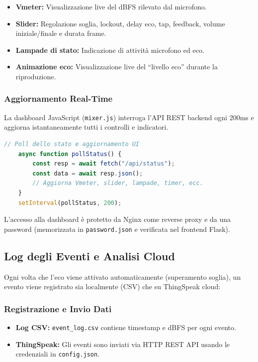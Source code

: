 \documentclass[fleqn,10pt]{SelfArx} %
\begin{document}
\begin{itemize}
	\item \textbf{Vmeter:} Visualizzazione live del dBFS rilevato dal microfono.
	\item \textbf{Slider:} Regolazione soglia, lockout, delay eco, tap, feedback, volume iniziale/finale e durata frame.
	\item \textbf{Lampade di stato:} Indicazione di attività microfono ed eco.
	\item \textbf{Animazione eco:} Visualizzazione live del “livello eco” durante la riproduzione.
\end{itemize}

\subsubsection{Aggiornamento Real-Time}

La dashboard JavaScript (\texttt{mixer.js}) interroga l’API REST backend ogni 200ms e aggiorna istantaneamente tutti i controlli e indicatori.

\begin{lstlisting}[language=JavaScript]
	// Poll dello stato e aggiornamento UI
	async function pollStatus() {
		const resp = await fetch("/api/status");
		const data = await resp.json();
		// Aggiorna Vmeter, slider, lampade, timer, ecc.
	}
	setInterval(pollStatus, 200);
\end{lstlisting}

L’accesso alla dashboard è protetto da Nginx come reverse proxy e da una password (memorizzata in \texttt{password.json} e verificata nel frontend Flask).


\subsection{Log degli Eventi e Analisi Cloud}

Ogni volta che l’eco viene attivato automaticamente (superamento soglia), un evento viene registrato sia localmente (CSV) che su ThingSpeak cloud:

\subsubsection{Registrazione e Invio Dati}

\begin{itemize}
	\item \textbf{Log CSV:} \texttt{event\_log.csv} contiene timestamp e dBFS per ogni evento.
	\item \textbf{ThingSpeak:} Gli eventi sono inviati via HTTP REST API usando le credenziali in \texttt{config.json}.
\end{itemize}
\end{document}
